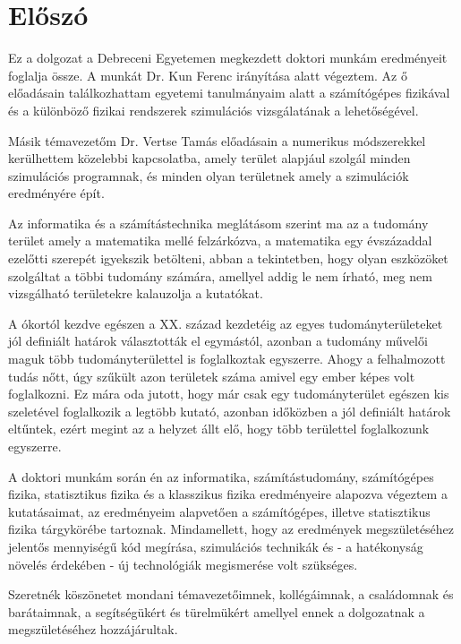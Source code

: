 \chapter*{Előszó}
\label{chapt:preface}

Ez a dolgozat a Debreceni Egyetemen megkezdett doktori munkám eredményeit foglalja össze. A munkát Dr. Kun Ferenc irányítása alatt végeztem. Az ő előadásain találkozhattam egyetemi tanulmányaim alatt  a számítógépes fizikával és a különböző fizikai rendszerek szimulációs vizsgálatának a lehetőségével. 

Másik témavezetőm Dr. Vertse Tamás előadásain a numerikus módszerekkel kerülhettem közelebbi kapcsolatba, amely terület alapjául szolgál minden szimulációs programnak, és minden olyan területnek amely a szimulációk eredményére épít.

Az informatika és a számítástechnika meglátásom szerint ma az a tudomány terület amely a matematika mellé felzárkózva, a matematika egy évszázaddal ezelőtti szerepét igyekszik betölteni, abban a tekintetben, hogy olyan eszközöket szolgáltat a többi tudomány számára, amellyel addig le nem írható, meg nem vizsgálható területekre kalauzolja a kutatókat. 

A ókortól kezdve egészen a XX. század kezdetéig az egyes tudományterületeket jól definiált határok választották el egymástól, azonban a tudomány művelői maguk több tudományterülettel is foglalkoztak egyszerre. \cite{introd_simonyi1998} Ahogy a felhalmozott tudás nőtt, úgy szűkült azon területek száma amivel egy ember képes volt foglalkozni. Ez mára oda jutott, hogy már csak egy tudományterület egészen kis szeletével foglalkozik a legtöbb kutató, azonban időközben a jól definiált határok eltűntek, ezért megint az a helyzet állt elő, hogy több területtel foglalkozunk egyszerre.

A doktori munkám során én az informatika, számítástudomány, számítógépes fizika, statisztikus fizika és a klasszikus fizika eredményeire alapozva végeztem a kutatásaimat, az eredményeim alapvetően a számítógépes, illetve statisztikus fizika tárgykörébe tartoznak. Mindamellett, hogy az eredmények megszületéséhez jelentős mennyiségű kód megírása, szimulációs technikák és - a hatékonyság növelés érdekében - új technológiák megismerése volt szükséges.

Szeretnék köszönetet mondani témavezetőimnek, kollégáimnak, a családomnak és barátaimnak, a segítségükért és türelmükért amellyel ennek a dolgozatnak a megszületéséhez hozzájárultak. 

